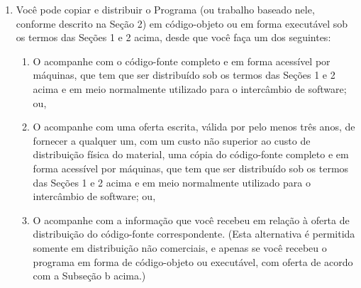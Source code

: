 {\begin{enumerate}
Estas exigências aplicam-se ao trabalho modificado como um todo. Se
seções identificáveis de tal trabalho não são derivadas do Programa, e
podem ser razoavelmente consideradas trabalhos independentes e
separados por si só, então esta Licença, e seus termos, não se aplicam
a estas seções quando você distribui-las como trabalhos em
separado. Mas quando você distribuir as mesmas seções como parte de um
todo que é trabalho baseado no Programa, a distribuição como um todo
tem que se enquadrar nos termos desta Licença, cujas permissões para
outros licenciados se estendem ao todo, portanto também para cada e
toda parte independente de quem a escreveu.

Desta forma, esta seção não tem a intenção de reclamar direitos os
contestar seus direitos sobre o trabalho escrito completamente por
você; ao invés disso, a intenção é a de exercitar o direito de
controlar a distribuição de trabalhos, derivados ou coletivos,
baseados no Programa.

Adicionalmente, a mera adição ao Programa de outro trabalho não
baseado no Programa (ou de trabalho baseado no Programa) em um volume
de armazenamento ou meio de distribuição não faz o outro trabalho
parte do escopo desta Licença.

\item Você pode copiar e distribuir o Programa (ou trabalho baseado
nele, conforme descrito na Seção 2) em código-objeto ou em forma
executável sob os termos das Seções 1 e 2 acima, desde que você
faça um dos seguintes:

\begin{enumerate}
    \item O acompanhe com o código-fonte completo e em forma acessível
    por máquinas, que tem que ser distribuído sob os termos das Seções
    1 e 2 acima e em meio normalmente utilizado para o intercâmbio de
    software; ou,

    \item O acompanhe com uma oferta escrita, válida por pelo menos três
    anos, de fornecer a qualquer um, com um custo não superior ao
    custo de distribuição física do material, uma cópia do
    código-fonte completo e em forma acessível por máquinas, que tem
    que ser distribuído sob os termos das Seções 1 e 2 acima e em meio
    normalmente utilizado para o intercâmbio de software; ou,

    \item O acompanhe com a informação que você recebeu em relação à
    oferta de distribuição do código-fonte correspondente. (Esta
    alternativa é permitida somente em distribuição não comerciais, e
    apenas se você recebeu o programa em forma de código-objeto ou
    executável, com oferta de acordo com a Subseção b acima.)
\end{enumerate}


\end{enumerate}}
